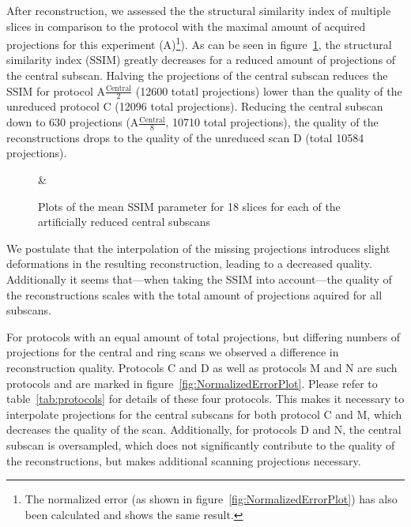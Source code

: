 After reconstruction, we assessed the the structural similarity index \cite{Wang2004} of multiple slices in comparison to the protocol with the maximal amount of acquired projections for this experiment (A)\footnote{The normalized error (as shown in figure~\ref{fig:NormalizedErrorPlot}) has also been calculated and shows the same result.}). As can be seen in figure~\ref{fig:ssimplot}, the structural similarity index (SSIM) greatly decreases for a reduced amount of projections of the central subscan. Halving the projections of the central subscan reduces the SSIM for protocol A$\frac{\textrm{Central}}{2}$ (12600 totatl projections) lower than the quality of the unreduced protocol C (12096 total projections). Reducing the central subscan down to 630 projections (A$\frac{\textrm{Central}}{8}$, 10710 total projections), the quality of the reconstructions drops to the quality of the unreduced scan D (total 10584 projections). 

\begin{figure}
	\centering
	\caption{Plots of the mean SSIM parameter for 18 slices for each of the artificially reduced central subscans}
		&%
	\label{fig:ssimplot}
\end{figure}

We postulate that the interpolation of the missing projections introduces slight deformations in the resulting reconstruction, leading to a decreased quality. Additionally it seems that---when taking the SSIM into account---the quality of the reconstructions scales with the total amount of projections aquired for all subscans.

For protocols with an equal amount of total projections, but differing numbers of projections for the central and ring scans we observed a difference in reconstruction quality. Protocols C and D as well as protocols M and N are such protocols and are marked in figure~\ref{fig:NormalizedErrorPlot}. Please refer to table~\ref{tab:protocols} for details of these four protocols. This makes it necessary to interpolate projections for the central subscans for both protocol C and M, which decreases the quality of the scan. Additionally, for protocols D and N, the central subscan is oversampled, which does not significantly contribute to the quality of the reconstructions, but makes additional scanning projections necessary. 

